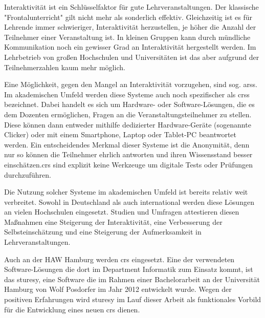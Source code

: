 Interaktivität ist ein Schlüsselfaktor für gute Lehrveranstaltungen. Der klassische "Frontalunterricht" gilt nicht mehr als sonderlich effektiv. Gleichzeitig ist es für Lehrende immer schwieriger, Interaktivität herzustellen, je höher die Anzahl der Teilnehmer einer Veranstaltung ist. In kleinen Gruppen kann durch mündliche Kommunikation noch ein gewisser Grad an Interaktivität hergestellt werden. Im Lehrbetrieb von großen Hochschulen und Universitäten ist das aber aufgrund der Teilnehmerzahlen kaum mehr möglich.

Eine Möglichkeit, gegen den Mangel an Interaktivität vorzugehen, sind sog. \acp{ars}. Im akademischen Umfeld werden diese Systeme auch noch spezifischer als \acp{crs} bezeichnet. Dabei handelt es sich um Hardware- oder Software-Lösungen, die es dem Dozenten ermöglichen, Fragen an die Veranstaltungsteilnehmer zu stellen. Diese können dann entweder mithilfe dedizierter Hardware-Geräte (sogenannte Clicker) oder mit einem Smartphone, Laptop oder Tablet-PC beantwortet werden. Ein entscheidendes Merkmal dieser Systeme ist die Anonymität, denn nur so können die Teilnehmer ehrlich antworten und ihren Wissensstand besser einschätzen.\ac{crs} sind explizit keine Werkzeuge um digitale Tests oder Prüfungen  durchzuführen.

Die Nutzung solcher Systeme im akademischen Umfeld ist bereits relativ weit verbreitet. Sowohl in Deutschland als auch international werden diese Lösungen an vielen Hochschulen eingesetzt. Studien und Umfragen attestieren diesen Maßnahmen eine Steigerung der Interaktivität, eine Verbesserung der Selbsteinschätzung und eine Steigerung der Aufmerksamkeit in Lehrveranstaltungen.\cite{web:wisconsin, web:tenyears}

Auch an der HAW Hamburg werden \ac{crs} eingesetzt. Eine der verwendeten Software-Lösungen die dort im Department Informatik zum Einsatz kommt, ist das \ac{sturesy}, eine Software die im Rahmen einer Bachelorarbeit an der Universität Hamburg von Wolf Posdorfer im Jahr 2012 entwickelt wurde\cite{article:sturesy}. Wegen der positiven Erfahrungen wird \ac{sturesy}  im Lauf dieser Arbeit als funktionales Vorbild für die Entwicklung eines neuen \ac{crs} dienen.